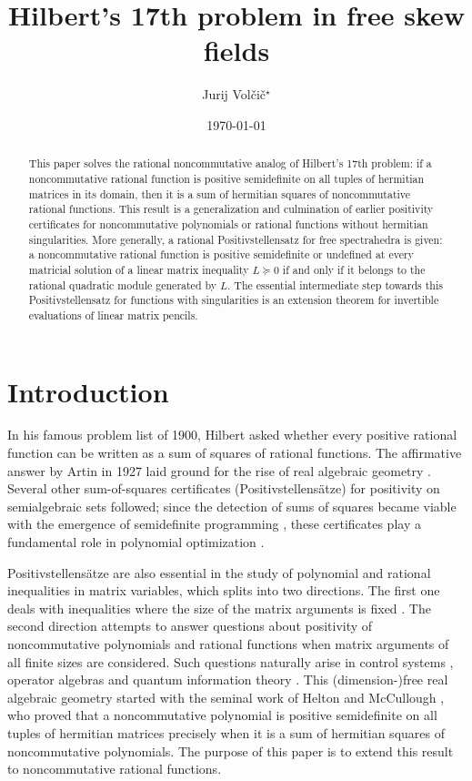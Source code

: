 \documentclass[12pt,a4paper]{amsart}
\title{Hilbert's 17th problem in free skew fields}
\author[J. Vol\v{c}i\v{c}]{Jurij Vol\v{c}i\v{c}${}^\star$}
\date{\today}
\theoremstyle{definition}
\theoremstyle{remark}
\numberwithin{equation}{section}
\begin{document}
	
\begin{abstract}
This paper solves the rational noncommutative analog of Hilbert's 17th problem: if a noncommutative rational function is positive semidefinite on all tuples of hermitian matrices in its domain, then it is a sum of hermitian squares of noncommutative rational functions. This result is a generalization and culmination of earlier positivity certificates for noncommutative polynomials or rational functions without hermitian singularities. More generally, a rational Positivstellensatz for free spectrahedra is given: a noncommutative rational function is positive semidefinite or undefined at every matricial solution of a linear matrix inequality $L\succeq0$ if and only if it belongs to the rational quadratic module generated by $L$. The essential intermediate step towards this Positivstellensatz for functions with singularities is an extension theorem for invertible evaluations of linear matrix pencils.
\end{abstract}


\maketitle


\section{Introduction}

In his famous problem list of 1900, Hilbert asked whether every positive rational function can be written as a sum of squares of rational functions. The affirmative answer by Artin in 1927 laid ground for the rise of real algebraic geometry \cite{BCR}. Several other sum-of-squares certificates (Positivstellens\"atze) for positivity on semialgebraic sets followed; since the detection of sums of squares became viable with the emergence of semidefinite programming \cite{WSV}, these certificates play a fundamental role in polynomial optimization \cite{Las,BPT}.

Positivstellens\"atze are also essential in the study of polynomial and rational inequalities in matrix variables, which splits into two directions.
The first one deals with inequalities where the size of the matrix arguments is fixed \cite{PS,KSV}.
The second direction attempts to answer questions about positivity of noncommutative polynomials and rational functions when matrix arguments of all finite sizes are considered. Such questions naturally arise in control systems \cite{dOHMP}, operator algebras \cite{Oza} and quantum information theory \cite{DLTW,many}.
This (dimension-)free real algebraic geometry started with the seminal work of Helton \cite{Hel} and McCullough \cite{McC}, who proved that a noncommutative polynomial is positive semidefinite on all tuples of hermitian matrices precisely when it is a sum of hermitian squares of noncommutative polynomials.
The purpose of this paper is to extend this result to noncommutative rational functions.
\end{document}
